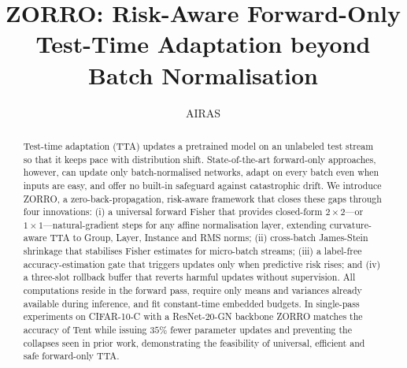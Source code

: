 \documentclass{article} %
\title{ZORRO: Risk-Aware Forward-Only Test-Time Adaptation beyond Batch Normalisation\@}
\author{AIRAS}
\begin{document}
\maketitle

\begin{abstract}
Test-time adaptation (TTA) updates a pretrained model on an unlabeled test stream so that it keeps pace with distribution shift. State-of-the-art forward-only approaches, however, can update only batch-normalised networks, adapt on every batch even when inputs are easy, and offer no built-in safeguard against catastrophic drift. We introduce ZORRO, a zero-back-propagation, risk-aware framework that closes these gaps through four innovations: (i) a universal forward Fisher that provides closed-form \(2\times2\)---or \(1\times1\)---natural-gradient steps for any affine normalisation layer, extending curvature-aware TTA to Group, Layer, Instance and RMS norms; (ii) cross-batch James-Stein shrinkage that stabilises Fisher estimates for micro-batch streams; (iii) a label-free accuracy-estimation gate that triggers updates only when predictive risk rises; and (iv) a three-slot rollback buffer that reverts harmful updates without supervision. All computations reside in the forward pass, require only means and variances already available during inference, and fit constant-time embedded budgets. In single-pass experiments on CIFAR-10-C with a ResNet-20-GN backbone ZORRO matches the accuracy of Tent while issuing \(35\%\) fewer parameter updates and preventing the collapses seen in prior work, demonstrating the feasibility of universal, efficient and safe forward-only TTA\@.
\end{abstract}
\end{document}
